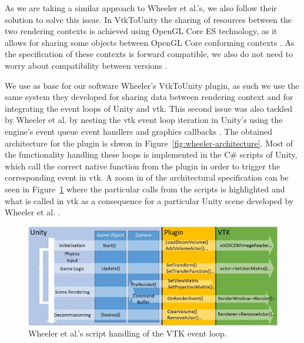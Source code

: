 As we are taking a similar approach to Wheeler et al.'s, we also follow their solution to solve this issue. In VtkToUnity the sharing of resources between the two rendering contexts is achieved using OpenGL Core ES technology, as it allows for sharing some objects between OpenGL Core conforming contexts \cite{wheeler_virtual_2018}. As the specification of these contexts is forward compatible, we also do not need to worry about compatibility between versions \cite{khronos_opengl_2021}.

We use as base for our software Wheeler's VtkToUnity plugin, as such we use the same system they developed for sharing data between rendering context and for integrating the event loops of Unity and \acrshort{vtk}. This second issue was also tackled by Wheeler et al. by nesting the \acrshort{vtk} event loop iteration in Unity's using the engine's event queue event handlers and graphics callbacks \cite{wheeler_virtual_2018}. The obtained architecture for the plugin is shwon in Figure~\ref{fig:wheeler-architecture}. Most of the functionality handling these loops is implemented in the C\# scripts of Unity, which call the correct native function from the plugin in order to trigger the corresponding event in \acrshort{vtk}. A zoom in of the architectural specification can be seen in Figure~\ref{fig:wheeler-architecture-zoomin} where the particular calls from the scripts is highlighted and what is called in \acrshort{vtk} as a consequence for a particular Unity scene developed by Wheeler et al. \cite{wheeler_virtual_2018}.

\begin{figure}[t]
    \centering
    \includegraphics[width=\textwidth]{pictures/wheeler_architecture_zoomin.jpg}
    \caption{Wheeler et al.'s script handling of the VTK event loop.}
    \label{fig:wheeler-architecture-zoomin}
\end{figure}

